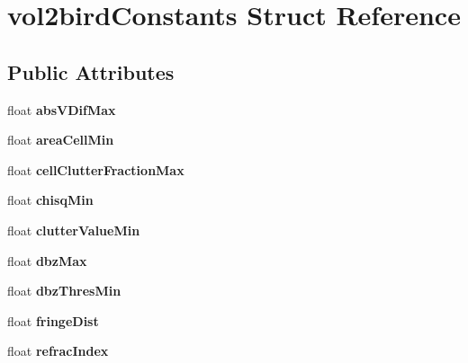 \hypertarget{structvol2birdConstants}{}\section{vol2bird\+Constants Struct Reference}
\label{structvol2birdConstants}
\subsection*{Public Attributes}
\begin{DoxyCompactItemize}
\item 
\mbox{\label{structvol2birdConstants_ae3d6b42a1de92f7d813c816193f8f724}} 
float {\bfseries abs\+V\+Dif\+Max}
\item 
\mbox{\label{structvol2birdConstants_a65c5b3bfb8d5ad485431aaa8483302f5}} 
float {\bfseries area\+Cell\+Min}
\item 
\mbox{\label{structvol2birdConstants_a1128429b5938a7ec20d289680f5f8200}} 
float {\bfseries cell\+Clutter\+Fraction\+Max}
\item 
\mbox{\label{structvol2birdConstants_a957527e30423873562e0d2ae63f5b30a}} 
float {\bfseries chisq\+Min}
\item 
\mbox{\label{structvol2birdConstants_a95739e822c53ee20624d5d3f87fc5f39}} 
float {\bfseries clutter\+Value\+Min}
\item 
\mbox{\label{structvol2birdConstants_aca2bb21893cc808ca21943419a7a4e55}} 
float {\bfseries dbz\+Max}
\item 
\mbox{\label{structvol2birdConstants_aca940c3457afbe3879f589069a4368ef}} 
float {\bfseries dbz\+Thres\+Min}
\item 
\mbox{\label{structvol2birdConstants_a848852548b766da20111c19dac4b7a97}} 
float {\bfseries fringe\+Dist}
\item 
\mbox{\label{structvol2birdConstants_ab1bdd3fa219a0a5f39b58254051eda43}} 
float {\bfseries refrac\+Index}

\end{DoxyCompactItemize}
